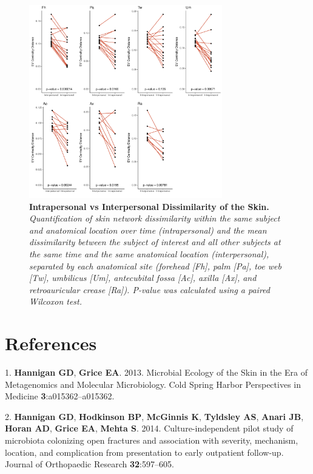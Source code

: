 \documentclass[12pt,]{article}
\begin{document}
\newpage

\begin{figure}[htbp]
\centering
\includegraphics[width=0.75000\textwidth]{../figures/intraallskin.pdf}
\caption{\textbf{Intrapersonal vs Interpersonal Dissimilarity of the
Skin.} \emph{Quantification of skin network dissimilarity within the
same subject and anatomical location over time (intrapersonal) and the
mean dissimilarity between the subject of interest and all other
subjects at the same time and the same anatomical location
(interpersonal), separated by each anatomical site (forehead {[}Fh{]},
palm {[}Pa{]}, toe web {[}Tw{]}, umbilicus {[}Um{]}, antecubital fossa
{[}Ac{]}, axilla {[}Ax{]}, and retroauricular crease {[}Ra{]}). P-value
was calculated using a paired Wilcoxon test.}\label{allskin}}
\end{figure}

\newpage

\section*{References}\label{references}

\hypertarget{refs}{}
\hypertarget{ref-Hannigan:2013im}{}
1. \textbf{Hannigan GD}, \textbf{Grice EA}. 2013. Microbial Ecology of
the Skin in the Era of Metagenomics and Molecular Microbiology. Cold
Spring Harbor Perspectives in Medicine \textbf{3}:a015362--a015362.

\hypertarget{ref-Hannigan:2014be}{}
2. \textbf{Hannigan GD}, \textbf{Hodkinson BP}, \textbf{McGinnis K},
\textbf{Tyldsley AS}, \textbf{Anari JB}, \textbf{Horan AD},
\textbf{Grice EA}, \textbf{Mehta S}. 2014. Culture-independent pilot
study of microbiota colonizing open fractures and association with
severity, mechanism, location, and complication from presentation to
early outpatient follow-up. Journal of Orthopaedic Research
\textbf{32}:597--605.
\end{document}
